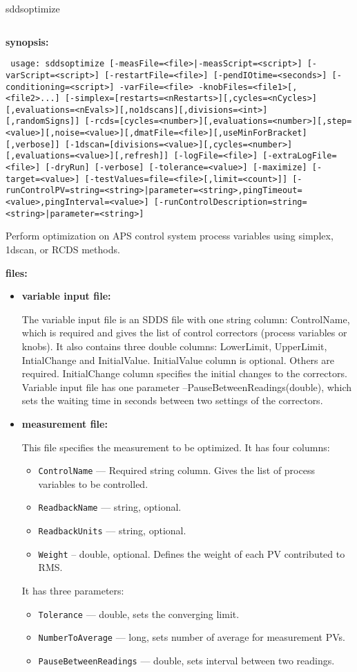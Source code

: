 \begin{sddsprog}{sddsoptimize}
\begin{verbatim}
\end{verbatim}

\item \textbf{synopsis:}
\begin{flushleft}{\tt
usage: sddsoptimize [-measFile=<file>|-measScript=<script>] [-varScript=<script>]\
[-restartFile=<file>] [-pendIOtime=<seconds>] [-conditioning=<script>]\
-varFile=<file> -knobFiles=<file1>[,<file2>...]\
[-simplex=[restarts=<nRestarts>][,cycles=<nCycles>][,evaluations=<nEvals>][,no1dscans][,divisions=<int>][,randomSigns]]\
[-rcds=[cycles=<number>][,evaluations=<number>][,step=<value>][,noise=<value>][,dmatFile=<file>][,useMinForBracket][,verbose]]\
[-1dscan=[divisions=<value>][,cycles=<number>][,evaluations=<value>][,refresh]]\
[-logFile=<file>] [-extraLogFile=<file>] [-dryRun] [-verbose] [-tolerance=<value>] [-maximize]\
[-target=<value>] [-testValues=file=<file>[,limit=<count>]]\
[-runControlPV={string=<string>|parameter=<string>},pingTimeout=<value>,pingInterval=<value>]\
[-runControlDescription={string=<string>|parameter=<string>}]
}\end{flushleft}
Perform optimization on APS control system process variables using simplex, 1dscan, or RCDS methods.
\item \textbf{files:}
\begin{itemize}
  \item \textbf{variable input file:} \par
The variable input file is an SDDS file with one string column: ControlName, which is required
and gives the list of control correctors (process variables or knobs). It also contains three
double columns: LowerLimit, UpperLimit, IntialChange and InitialValue. InitialValue column
is optional. Others are required. InitialChange column specifies the initial changes to the correctors.
Variable input file has one parameter --PauseBetweenReadings(double), which sets the waiting time in
seconds between two settings of the correctors.
  \item \textbf{measurement file:} \par This file specifies the measurement to be optimized.
It has four columns:
  \begin{itemize}
    \item {\tt ControlName} --- Required string column. Gives the list of process variables
                 to be controlled.
    \item {\tt ReadbackName} --- string, optional.
    \item {\tt ReadbackUnits} --- string, optional.
    \item {\tt Weight} -- double, optional. Defines the weight of each PV contributed to RMS.
  \end{itemize}
It has three parameters:
  \begin{itemize}
    \item {\tt Tolerance} --- double, sets the converging limit.
    \item {\tt NumberToAverage} --- long, sets number of average for measurement PVs.
    \item {\tt PauseBetweenReadings} --- double, sets interval between two readings.


\end{itemize}
\end{itemize}
\end{sddsprog}
